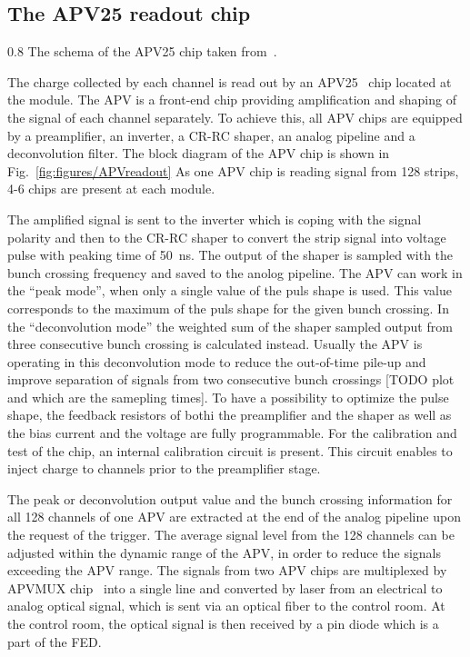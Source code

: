 \subsection{The APV25 readout chip \label{sec:APV}}


                 {0.8}       %
                 {The schema of the APV25 chip taken from~\cite{Friedl:2001kra}.} %

The charge collected by each channel is read out by an APV25~\cite{French:2001xb} chip located at the module. The APV is a front-end chip providing amplification and shaping of the signal of each channel separately. To achieve this, all APV chips are equipped by a preamplifier, an inverter, a CR-RC shaper, an analog pipeline and a deconvolution filter. The block diagram of the APV chip is shown in Fig.~\ref{fig:figures/APVreadout} As one APV chip is reading signal from 128 strips, 4-6 chips are present at each module.

The amplified signal is sent to the inverter which is coping with the signal polarity and then to the CR-RC shaper to convert the strip signal into voltage pulse with peaking time of 50~ns. The output of the shaper is sampled with the bunch crossing frequency and saved to the anolog pipeline. The APV can work in the ``peak mode'', when only a single value of the puls shape is used. This value corresponds to the maximum of the puls shape for the given bunch crossing. In the ``deconvolution mode'' the weighted sum of the shaper sampled output from three consecutive bunch crossing is calculated instead. Usually the APV is operating in this deconvolution mode to reduce the out-of-time pile-up and improve separation of signals from two consecutive bunch crossings [TODO plot and which are the samepling times]. To have a possibility to optimize the pulse shape, the feedback resistors of bothi the preamplifier and the shaper as well as the  bias current and the voltage are fully programmable. For the calibration and test of the chip, an internal calibration circuit is present. This circuit enables to inject charge to channels prior to the preamplifier stage.

The peak or deconvolution output value and the bunch crossing information for all 128 channels of one APV are extracted at the end of the analog pipeline upon the request of the trigger. The average signal level from the 128 channels can be adjusted within the dynamic range of the APV, in order to reduce the signals exceeding the APV range. The signals from two APV chips are multiplexed by APVMUX chip~\cite{Ball:2007zza} into a single line and converted by laser from an electrical to analog optical signal, which is sent via an optical fiber to the control room. At the control room, the optical signal is then received by a pin diode which is a part of the FED.

